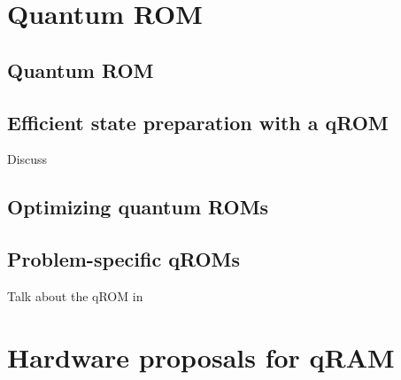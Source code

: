 \documentclass[a4paper,10pt]{article}
\begin{document}
{{%

\section{Quantum ROM}
\label{sec:circuits}

\subsection{Quantum ROM}

\subsection{Efficient state preparation with a qROM}

Discuss \cite{Vadym2018}

\subsection{Optimizing quantum ROMs}

\subsection{Problem-specific qROMs}

Talk about the qROM in \cite{Babbush2018}

\section{Hardware proposals for qRAM}
\label{sec:hardware}




}}
\end{document}
